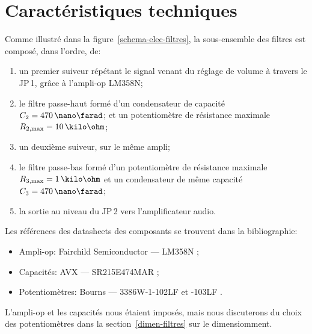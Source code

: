 \section{Caractéristiques techniques}
\label{sec:filtres/car-tech}

Comme illustré dans la figure~\ref{schema-elec-filtres},
la sous-ensemble des filtres est composé, dans l'ordre, de:
\begin{enumerate}
    \item un premier suiveur répétant le signal venant du réglage de volume
        à travers le JP\,1, grâce à l'ampli-op LM358N;
    \item le filtre passe-haut formé d'un
        condensateur de capacité $C_2 = 470\,\nano\farad$;
        et un potentiomètre de résistance
        maximale $R\ind{2,max} = 10\,\kilo\ohm$;
    \item un deuxième suiveur, sur le même ampli;
    \item le filtre passe-bas formé d'un potentiomètre de résistance
        maximale $R\ind{3,max} = 1\,\kilo\ohm$
        et un condensateur de même capacité $C_3 = 470\,\nano\farad$;
    \item la sortie au niveau du JP\,2 vers l'amplificateur audio.
\end{enumerate}

Les références des datasheets des composants se trouvent dans la bibliographie:
\begin{itemize}
    \item Ampli-op: Fairchild Semiconductor --- LM358N \cite{datasheet-lm358n};
    \item Capacités: AVX --- SR215E474MAR \cite{datasheet-470nf};
    \item Potentiomètres: Bourns --- 3386W-1-102LF et -103LF \cite{datasheet-pot}.
\end{itemize}

L'ampli-op et les capacités nous étaient imposés,
mais nous discuterons du choix des potentiomètres dans
la section~\ref{dimen-filtres} sur le dimensiomment.
